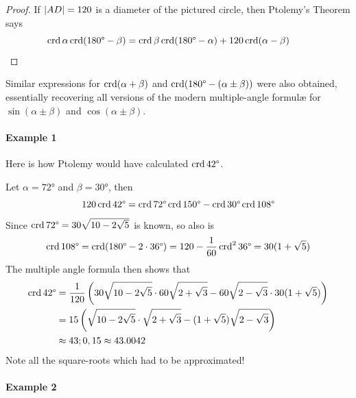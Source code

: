 \begin{proof}
	If $\nm{AD}=120$ is a diameter of the pictured circle, then Ptolemy's Theorem says
	\[
		\crd\alpha\crd(\ang{180}-\beta)=\crd\beta\crd(\ang{180}-\alpha)+120\crd(\alpha-\beta) \tag*{\qedhere}
	\]
	\vspace{-12pt}
\end{proof}

Similar expressions for $\crd(\alpha+\beta)$ and $\crd(\ang{180}-(\alpha\pm\beta))$ were also obtained, essentially recovering all versions of the modern multiple-angle formulæ for $\sin(\alpha\pm\beta)$ and $\cos(\alpha\pm\beta)$.



\paragraph{Example 1}

Here is how Ptolemy would have calculated $\crd \ang{42}$.\par
Let $\alpha=\ang{72}$ and $\beta=\ang{30}$, then
\[
	120\crd \ang{42} =\crd\ang{72}\crd\ang{150} -\crd\ang{30}\crd \ang{108}
\]
Since $\crd \ang{72}=30\sqrt{10-2\sqrt 5}$ is known, so also is
\[
	\crd \ang{108} =\crd(\ang{180}-2\cdot\ang{36}) =120-\frac 1{60}\crd^2\ang{36} =30(1+\sqrt 5)
\]
The multiple angle formula then shows that
\begin{align*}
	\crd \ang{42}
	&=\frac 1{120}\left(30\sqrt{10-2\sqrt 5}\cdot 60\sqrt{2+\sqrt 3} 
		-60\sqrt{2-\sqrt 3} \cdot 30(1+\sqrt 5)\right)\\
	&=15\left(\sqrt{10-2\sqrt 5}\cdot \sqrt{2+\sqrt 3} 
		-(1+\sqrt 5)\sqrt{2-\sqrt 3}\right)\\
	&\approx 43;0,15\approx 43.0042
\end{align*}
Note all the square-roots which had to be approximated!


\paragraph{Example 2}

